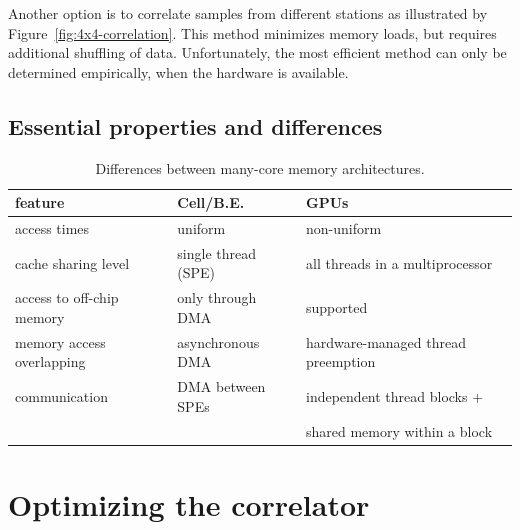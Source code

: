 \documentclass{article}
\begin{document}
Another option is to correlate samples from different stations as illustrated
by Figure~\ref{fig:4x4-correlation}.
This method minimizes memory loads, but requires additional shuffling of data.
Unfortunately, the most efficient method can only be determined empirically,
when the hardware is available.


\subsection{Essential properties and differences}

\begin{table}[t]
\begin{center}
{\small
\begin{tabular}{l|l|l}
feature                   & Cell/B.E.                      & GPUs \\
\hline
access times              & uniform                        & non-uniform \\
cache sharing level       & single thread (SPE)            & all threads in a multiprocessor \\
access to off-chip memory & only through DMA               & supported \\
memory access overlapping & asynchronous DMA               & hardware-managed thread preemption \\
communication             & DMA between SPEs               & independent thread blocks + \\
                          &                                & shared memory within a block \\
\end{tabular}
} %
\end{center}
\vspace{-0.5cm}
\caption{Differences between many-core memory architectures.}
\label{memory-properties}
\end{table}


\section{Optimizing the correlator}
\end{document}
